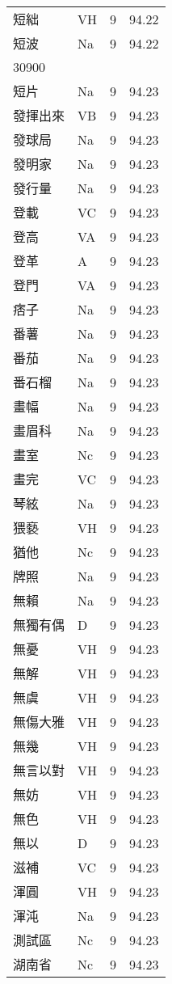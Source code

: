 \documentclass[twocolumn]{book}
\begin{document}
\begin{supertabular}{llrr}
短絀 & VH & 9 &  94.22\\
短波 & Na & 9 &  94.22\\
30900\\
短片 & Na & 9 &  94.23\\
發揮出來 & VB & 9 &  94.23\\
發球局 & Na & 9 &  94.23\\
發明家 & Na & 9 &  94.23\\
發行量 & Na & 9 &  94.23\\
登載 & VC & 9 &  94.23\\
登高 & VA & 9 &  94.23\\
登革 & A & 9 &  94.23\\
登門 & VA & 9 &  94.23\\
痞子 & Na & 9 &  94.23\\
番薯 & Na & 9 &  94.23\\
番茄 & Na & 9 &  94.23\\
番石榴 & Na & 9 &  94.23\\
畫幅 & Na & 9 &  94.23\\
畫眉科 & Na & 9 &  94.23\\
畫室 & Nc & 9 &  94.23\\
畫完 & VC & 9 &  94.23\\
琴絃 & Na & 9 &  94.23\\
猥褻 & VH & 9 &  94.23\\
猶他 & Nc & 9 &  94.23\\
牌照 & Na & 9 &  94.23\\
無賴 & Na & 9 &  94.23\\
無獨有偶 & D & 9 &  94.23\\
無憂 & VH & 9 &  94.23\\
無解 & VH & 9 &  94.23\\
無虞 & VH & 9 &  94.23\\
無傷大雅 & VH & 9 &  94.23\\
無幾 & VH & 9 &  94.23\\
無言以對 & VH & 9 &  94.23\\
無妨 & VH & 9 &  94.23\\
無色 & VH & 9 &  94.23\\
無以 & D & 9 &  94.23\\
滋補 & VC & 9 &  94.23\\
渾圓 & VH & 9 &  94.23\\
渾沌 & Na & 9 &  94.23\\
測試區 & Nc & 9 &  94.23\\
湖南省 & Nc & 9 &  94.23\\

\end{supertabular}
\end{document}
